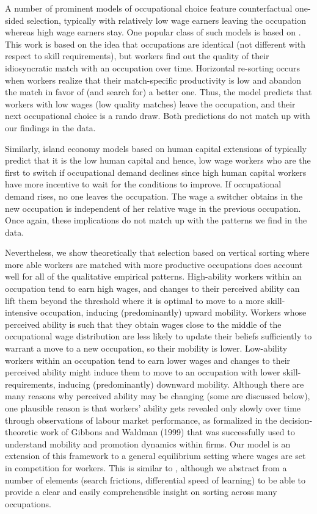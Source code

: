 \documentclass[12pt]{article}
\newcommand{\highlightR}[1]{{\emph{\color{MyRed}{#1}}}}
\theoremstyle{definition}
\begin{document}
A number of prominent models of occupational choice feature counterfactual one-sided selection, typically with relatively low wage earners leaving the occupation whereas high wage earners stay. One popular class of such models is based on \highlightR{horizontal sorting due to match-specific shocks}. This work is based on the idea that occupations are identical (not different with respect to skill requirements), but workers find out the quality of their idiosyncratic match with an occupation over time. Horizontal re-sorting occurs when workers realize that their match-specific productivity is low and abandon the match in favor of (and search for) a better one. Thus, the model predicts that workers with low wages (low quality matches) leave the occupation, and their next occupational choice is a rando draw. Both predictions do not match up with our findings in the data. 

Similarly, island economy models based on human capital extensions of \citet{lucasEquilibriumSearchUnemployment1974} typically predict that it is the low human capital and hence, low wage workers who are the first to switch if occupational demand declines since high human capital workers have more incentive to wait for the conditions to improve. If occupational demand rises, no one leaves the occupation. The wage a switcher obtains in the new occupation is independent of her relative wage in the previous occupation. Once again, these implications do not match up with the patterns we find in the data. 

Nevertheless, we show theoretically that selection based on vertical sorting where more able workers are matched with more productive occupations does account well for all of the qualitative empirical patterns. High-ability workers within an occupation tend to earn high wages, and changes to their perceived ability can lift them beyond the threshold where it is optimal to move to a more skill-intensive occupation, inducing (predominantly) upward mobility. Workers whose perceived ability is such that they obtain wages close to the middle of the occupational wage distribution are less likely to update their beliefs sufficiently to warrant a move to a new occupation, so their mobility is lower. Low-ability workers within an occupation tend to earn lower wages and changes to their perceived ability might induce them to move to an occupation with lower skill-requirements, inducing (predominantly) downward mobility. Although there are many reasons why perceived ability may be changing (some are discussed below), one plausible reason is that workers' ability gets revealed only slowly over time through observations of labour market performance, as formalized in the decision-theoretic work of Gibbons and Waldman (1999) that was successfully used to understand mobility and promotion dynamics within firms. Our model is an extension of this framework to a general equilibrium setting where wages are set in competition for workers. This is similar to \citet{papageorgiouLearningYourComparative2014}, although we abstract from a number of elements (search frictions, differential speed of learning) to be able to provide a clear and easily comprehensible insight on sorting across many occupations.
\end{document}
